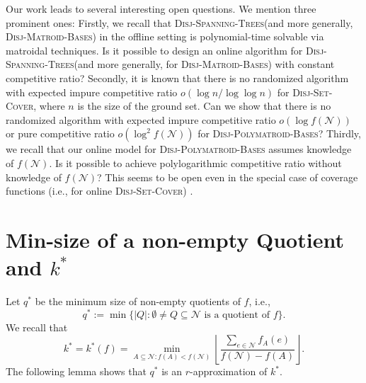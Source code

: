 \documentclass[11pt]{article}
\theoremstyle{definition}
\newcommand{\calN}{{\mathcal{N}}}
\newcommand{\DPB}{\textsc{Disj-Polymatroid-Bases}\xspace}
\newcommand{\DSC}{\textsc{Disj-Set-Cover}\xspace}
\newcommand{\DMB}{\textsc{Disj-Matroid-Bases}\xspace}
\newcommand{\DST}{\textsc{Disj-Spanning-Trees}\xspace}
\begin{document}
Our work leads to several interesting open questions. We mention three prominent ones: 
Firstly, we recall that \DST (and more generally, \DMB) in the offline setting is polynomial-time solvable via matroidal techniques. Is it possible to design an online algorithm for \DST (and more generally, for \DMB) with constant competitive ratio? 
Secondly, it is known that there is no randomized algorithm with expected impure competitive ratio $o(\log{n}/\log\log{n})$ for \DSC, where $n$ is the size of the ground set. Can we show that there is no randomized algorithm with expected impure competitive ratio $o(\log{f(\calN)})$ or pure competitive ratio $o(\log^2{f(\calN)})$ for \DPB? 
Thirdly, we recall that our online model for \DPB assumes knowledge of $f(\calN)$. Is it possible to achieve polylogarithmic competitive ratio without knowledge of $f(\calN)$? This seems to be open even in the special case of coverage functions (i.e., for online \DSC) \cite{EGK19}. 










%
 



\newpage
\appendix
\section{Min-size of a non-empty Quotient and $k^*$}
\label{section:appendix-quotient}
Let $q^*$ be the minimum size of non-empty quotients of $f$, i.e., $$q^*:=\min\{|Q|:\emptyset\neq Q\subseteq \mathcal{N} \text{ is a quotient of $f$}\}.$$
We recall that 
$$
    k^*=k^*(f)=\min_{A\subseteq \mathcal{N}: f(A)<f(\mathcal{N})} \left\lfloor \frac{\sum_{e\in \mathcal{N}}f_A(e)}{f(\mathcal{N})-f(A)}\right\rfloor.
$$
The following lemma shows that $q^*$ is an $r$-approximation of $k^*$.
\end{document}
